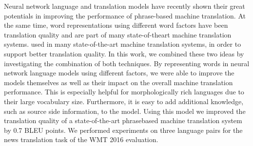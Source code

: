 Neural network language and translation models have recently shown their great potentials in improving the performance of phrase-based machine translation. At the same time, word representations using different word factors have been translation quality and are part of many state-of-theart machine translation systems. used in many state-of-the-art machine translation systems, in order to support better translation quality. In this work, we combined these two ideas by investigating the combination of both techniques. By representing words in neural network language models using different factors, we were able to improve the models themselves as well as their impact on the overall machine translation performance. This is especially helpful for morphologically rich languages due to their large vocabulary size. Furthermore, it is easy to add additional knowledge, such as source side information, to the model. Using this model we improved the translation quality of a state-of-the-art phrasebased machine translation system by 0.7 BLEU points. We performed experiments on three language pairs for the news translation task of the WMT 2016 evaluation.
